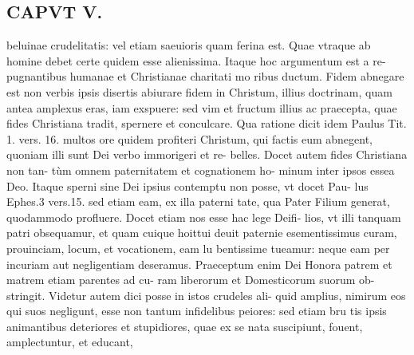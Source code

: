 \documentclass{article}
\begin{document}
\begin{pages}
\section*{CAPVT  V. }
\marginpar{[ p.267 ]}\pstart beluinae crudelitatis: vel etiam saeuioris quam ferina est. Quae vtraque ab homine debet certe quidem esse alienissima. Itaque hoc argumentum est a re- pugnantibus humanae et Christianae charitati mo ribus ductum.  \pend\pstart Fidem abnegare est non verbis ipsis disertis abiurare fidem in Christum, illius doctrinam, quam antea amplexus eras, iam exspuere: sed vim et fructum illius ac praecepta, quae fides Christiana tradit, spernere et conculcare. Qua ratione dicit idem Paulus Tit. 1. vers. 16. multos ore quidem profiteri Christum, qui factis eum abnegent, quoniam illi sunt Dei verbo immorigeri et re- belles. Docet autem fides Christiana non tan- tùm omnem paternitatem et cognationem ho- minum inter ipsos essea Deo. Itaque sperni sine Dei ipsius contemptu non posse, vt docet Pau- lus Ephes.3 vers.15. sed etiam eam, ex illa paterni tate, qua Pater Filium generat, quodammodo profluere. Docet etiam nos esse hac lege Deifi- lios, vt illi tanquam patri obsequamur, et quam cuique hoittui deuit paternie esementissimus curam, prouinciam, locum, et vocationem, eam lu bentissime tueamur: neque eam per incuriam aut negligentiam deseramus. Praeceptum enim Dei Honora patrem et matrem etiam parentes ad cu- ram liberorum et Domesticorum suorum ob- stringit.  \pend\pstart Videtur autem dici posse in istos crudeles ali- quid amplius, nimirum eos qui suos negligunt, esse non tantum infidelibus peiores: sed etiam bru tis ipsis animantibus deteriores et stupidiores, quae ex se nata suscipiunt, fouent, amplectuntur, et educant,  \pend

\end{pages}
\end{document}
